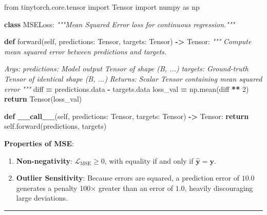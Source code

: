 \documentclass[
  letterpaper,
]{scrbook}
\newenvironment{Shaded}{\begin{snugshade}}{\end{snugshade}}
\newcommand{\CommentTok}[1]{\textcolor[rgb]{0.56,0.35,0.01}{\textit{#1}}}
\newcommand{\ControlFlowTok}[1]{\textcolor[rgb]{0.13,0.29,0.53}{\textbf{#1}}}
\newcommand{\DecValTok}[1]{\textcolor[rgb]{0.00,0.00,0.81}{#1}}
\newcommand{\FunctionTok}[1]{\textcolor[rgb]{0.13,0.29,0.53}{\textbf{#1}}}
\newcommand{\ImportTok}[1]{#1}
\newcommand{\KeywordTok}[1]{\textcolor[rgb]{0.13,0.29,0.53}{\textbf{#1}}}
\newcommand{\NormalTok}[1]{#1}
\newcommand{\OperatorTok}[1]{\textcolor[rgb]{0.81,0.36,0.00}{\textbf{#1}}}
\newcommand{\VariableTok}[1]{\textcolor[rgb]{0.00,0.00,0.00}{#1}}
\providecommand{\tightlist}{%
  \setlength{\itemsep}{0pt}\setlength{\parskip}{0pt}}
\begin{document}
\begin{Shaded}
\begin{Highlighting}[]
\ImportTok{from}\NormalTok{ tinytorch.core.tensor }\ImportTok{import}\NormalTok{ Tensor}
\ImportTok{import}\NormalTok{ numpy }\ImportTok{as}\NormalTok{ np}

\KeywordTok{class}\NormalTok{ MSELoss:}
    \CommentTok{"""Mean Squared Error loss for continuous regression."""}

    \KeywordTok{def}\NormalTok{ forward(}\VariableTok{self}\NormalTok{, predictions: Tensor, targets: Tensor) }\OperatorTok{{-}\textgreater{}}\NormalTok{ Tensor:}
        \CommentTok{"""}
\CommentTok{        Compute mean squared error between predictions and targets.}

\CommentTok{        Args:}
\CommentTok{            predictions: Model output Tensor of shape (B, ...)}
\CommentTok{            targets: Ground{-}truth Tensor of identical shape (B, ...)}
\CommentTok{        Returns:}
\CommentTok{            Scalar Tensor containing mean squared error}
\CommentTok{        """}
\NormalTok{        diff }\OperatorTok{=}\NormalTok{ predictions.data }\OperatorTok{{-}}\NormalTok{ targets.data}
\NormalTok{        loss\_val }\OperatorTok{=}\NormalTok{ np.mean(diff }\OperatorTok{**} \DecValTok{2}\NormalTok{)}
        \ControlFlowTok{return}\NormalTok{ Tensor(loss\_val)}

    \KeywordTok{def} \FunctionTok{\_\_call\_\_}\NormalTok{(}\VariableTok{self}\NormalTok{, predictions: Tensor, targets: Tensor) }\OperatorTok{{-}\textgreater{}}\NormalTok{ Tensor:}
        \ControlFlowTok{return} \VariableTok{self}\NormalTok{.forward(predictions, targets)}
\end{Highlighting}
\end{Shaded}

\textbf{Properties of MSE}:

\begin{enumerate}
\def\labelenumi{\arabic{enumi}.}
\tightlist
\item
  \textbf{Non-negativity}: \(\mathcal{L}_{\text{MSE}} \ge 0\), with
  equality if and only if \(\hat{\mathbf{y}} = \mathbf{y}\).
\item
  \textbf{Outlier Sensitivity}: Because errors are squared, a prediction
  error of \(10.0\) generates a penalty 100× greater than an error of
  \(1.0\), heavily discouraging large deviations.
\end{enumerate}

\begin{center}\rule{0.5\linewidth}{0.5pt}\end{center}
\end{document}
